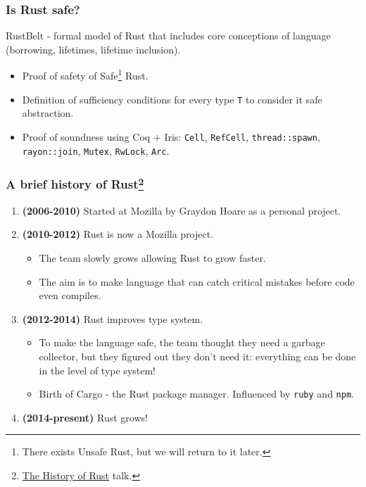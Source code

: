 \documentclass[aspectratio=1610,t]{beamer}
\begin{document}

\begin{frame}[fragile]
\frametitle{Is Rust safe?}
RustBelt - formal model of Rust that includes core conceptions of language (borrowing, lifetimes, lifetime inclusion).

\begin{itemize}
    \item Proof of safety of Safe\footnote{There exists Unsafe Rust, but we will return to it later.} Rust.
    \item Definition of sufficiency conditions for every type \texttt{T} to consider it safe abstraction.
    \item Proof of soundness using Coq + Iris: \texttt{Cell}, \texttt{RefCell}, \texttt{thread::spawn}, \texttt{rayon::join}, \texttt{Mutex}, \texttt{RwLock}, \texttt{Arc}.
\end{itemize}
\end{frame}


\begin{frame}
\frametitle{A brief history of Rust\footnote{\href{https://www.youtube.com/watch?v=79PSagCD_AY}{The History of Rust} talk.}}

\begin{enumerate}
    \item \textbf{(2006-2010)} Started at Mozilla by Graydon Hoare as a personal project.
    \item \textbf{(2010-2012)} Rust is now a Mozilla project.
    \begin{itemize}
        \item The team slowly grows allowing Rust to grow faster.
        \item The aim is to make language that can catch critical mistakes before code even compiles.
    \end{itemize}
    \item \textbf{(2012-2014)} Rust improves type system.
    \begin{itemize}
        \item To make the language safe, the team thought they need a garbage collector, but they figured out they don't need it: everything can be done in the level of type system!
        \item Birth of Cargo - the Rust package manager. Influenced by \texttt{ruby} and \texttt{npm}.
    \end{itemize}
    \item \textbf{(2014-present)} Rust grows!
\end{enumerate}
\end{frame}
\end{document}
